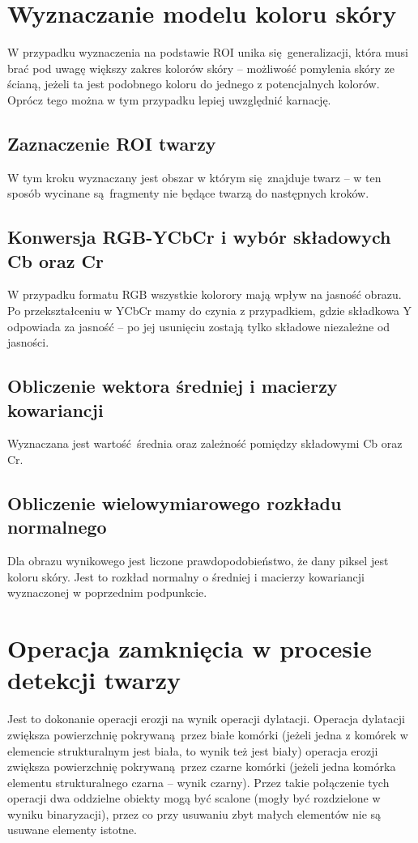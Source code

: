 \documentclass[a4paper, 12pt, titlepage]{article}
\begin{document}
    \section{Wyznaczanie modelu koloru skóry}
        W przypadku wyznaczenia na podstawie ROI unika się generalizacji, która
        musi brać pod uwagę większy zakres kolorów skóry -- możliwość pomylenia
        skóry ze ścianą, jeżeli ta jest podobnego koloru do jednego z
        potencjalnych kolorów. Oprócz tego można w tym przypadku lepiej 
        uwzględnić karnację.
        \subsection{Zaznaczenie ROI twarzy}
            W tym kroku wyznaczany jest obszar w którym się znajduje twarz --
            w ten sposób wycinane są fragmenty nie będące twarzą do następnych
            kroków.
        \subsection{Konwersja RGB-YCbCr i wybór składowych Cb oraz Cr}
            W przypadku formatu RGB wszystkie kolorory mają wpływ na jasność
            obrazu. Po przekształceniu w YCbCr mamy do czynia z przypadkiem,
            gdzie składkowa Y odpowiada za jasność -- po jej usunięciu zostają
            tylko składowe niezależne od jasności.
        \subsection{Obliczenie wektora średniej i macierzy kowariancji}
            Wyznaczana jest wartość średnia oraz zależność pomiędzy składowymi
            Cb oraz Cr.
        \subsection{Obliczenie wielowymiarowego rozkładu normalnego}
            Dla obrazu wynikowego jest liczone prawdopodobieństwo, że dany
            piksel jest koloru skóry. Jest to rozkład normalny o średniej i
            macierzy kowariancji wyznaczonej w poprzednim podpunkcie.

    \section{Operacja zamknięcia w procesie detekcji twarzy}
        Jest to dokonanie operacji erozji na wynik operacji dylatacji. Operacja
        dylatacji zwiększa powierzchnię pokrywaną przez białe komórki (jeżeli
        jedna z komórek w elemencie strukturalnym jest biała, to wynik też jest
        biały) operacja erozji zwiększa powierzchnię pokrywaną przez czarne 
        komórki (jeżeli jedna komórka elementu strukturalnego czarna -- wynik 
        czarny). Przez takie połączenie tych operacji dwa oddzielne obiekty
        mogą być scalone (mogły być rozdzielone w wyniku binaryzacji), przez
        co przy usuwaniu zbyt małych elementów nie są usuwane elementy istotne.
\end{document}
